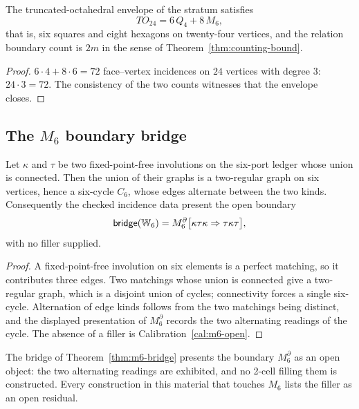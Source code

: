 \begin{proposition}\label{prop:envelope}
The truncated-octahedral envelope of the stratum satisfies
\[
  TO_{24}=6\,Q_4+8\,M_6 ,
\]
that is, six squares and eight hexagons on twenty-four vertices, and the relation boundary
count is $2m$ in the sense of Theorem~\ref{thm:counting-bound}.
\end{proposition}

\begin{proof}
$6\cdot4+8\cdot6=72$ face--vertex incidences on $24$ vertices with degree $3$:
$24\cdot3=72$.  The consistency of the two counts witnesses that the envelope closes.
\end{proof}

\subsection{The $M_6$ boundary bridge}

\begin{theorem}\label{thm:m6-bridge}
Let $\kappa$ and $\tau$ be two fixed-point-free involutions on the six-port ledger whose
union is connected.  Then the union of their graphs is a two-regular graph on six vertices,
hence a six-cycle $C_6$, whose edges alternate between the two kinds.  Consequently the
checked incidence data present the open boundary
\[
  \mathsf{bridge}(\mathbb{W}_6)=M_6^{\partial}\bigl[\kappa\tau\kappa
  \Rightarrow\tau\kappa\tau\bigr],
\]
with no filler supplied.
\end{theorem}

\begin{proof}
A fixed-point-free involution on six elements is a perfect matching, so it contributes three
edges.  Two matchings whose union is connected give a two-regular graph, which is a disjoint
union of cycles; connectivity forces a single six-cycle.  Alternation of edge kinds follows
from the two matchings being distinct, and the displayed presentation of $M_6^{\partial}$
records the two alternating readings of the cycle.  The absence of a filler is
Calibration~\ref{cal:m6-open}.
\end{proof}

\begin{calibration}\label{cal:m6-open}
The bridge of Theorem~\ref{thm:m6-bridge} presents the boundary $M_6^{\partial}$ as an open
object: the two alternating readings are exhibited, and no 2-cell filling them is
constructed.  Every construction in this material that touches $M_6$ lists the filler as an
open residual.
\end{calibration}


